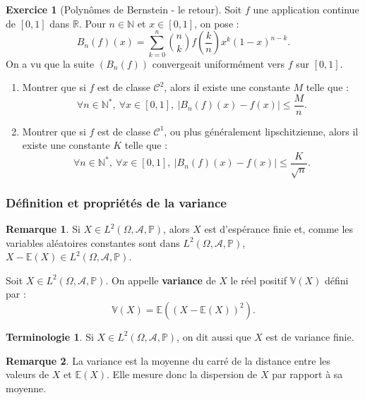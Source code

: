 \documentclass[french]{article}
\renewcommand{\P}{\mathbb{P}}
\newcommand{\N}{\mathbb{N}}
\newcommand{\R}{\mathbb{R}}
\newcommand{\st}{^*}
\newcommand{\E}{\mathbb{E}}
\newcommand{\V}{\mathbb{V}}
\theoremstyle{plain}
\theoremstyle{definition}
\newtheorem{exo}{Exercice}
\newtheorem*{rmq}{Remarque}
\newtheorem*{terminologie}{Terminologie}
\theoremstyle{remark}
\begin{document}
\begin{exo}[Polynômes de Bernstein - le retour]
	Soit $f$ une application continue de $[0,1]$ dans $\R$. Pour $n\in\N$ et $x\in[0,1]$, on pose :
	$$B_n(f)(x)=\sum_{k=0}^{n}\binom{n}{k}f\left(\frac{k}{n}\right)x^k(1-x)^{n-k}.$$
	On a vu que la suite $(B_n(f))$ convergeait uniformément vers $f$ sur $[0,1]$.
	\begin{enumerate}
		\item Montrer que si $f$ est de classe $\mathcal{C}^2$, alors il existe une constante $M$ telle que :
		$$\forall n\in\N\st,\ \forall x\in [0,1],\ \lvert B_n(f)(x)-f(x)\rvert\leqslant\frac{M}{n}.$$ %
		\item Montrer que si $f$ est de classe $\mathcal{C}^1$, ou plus généralement lipschitzienne, alors il existe une constante $K$ telle que :
		$$\forall n\in\N\st,\ \forall x\in[0,1],\ \lvert B_n(f)(x)-f(x)\rvert\leqslant\frac{K}{\sqrt{n}}.$$
	\end{enumerate}
\end{exo}

\subsubsection*{Définition et propriétés de la variance}

\begin{rmq}
	Si $X\in L^2(\Omega,\mathcal{A},\P)$, alors $X$ est d'espérance finie et, comme les variables aléatoires constantes sont dans $L^2(\Omega,\mathcal{A},\P)$, $X-\E(X)\in L^2(\Omega,\mathcal{A},\P)$.
\end{rmq}

\begin{dfn}
	Soit $X\in L^2(\Omega,\mathcal{A},\P)$. On appelle \textbf{variance} de $X$ le réel positif $\V(X)$ défini par :
	$$\V(X)=\E((X-\E(X))^2).$$
\end{dfn}

\begin{terminologie}
	Si $X\in L^2(\Omega,\mathcal{A},\P)$, on dit aussi que $X$ est de variance finie.
\end{terminologie}

\begin{rmq}
	La variance est la moyenne du carré de la distance entre les valeurs de $X$ et $\E(X)$. Elle mesure donc la dispersion de $X$ par rapport à sa moyenne.
\end{rmq}
\end{document}
